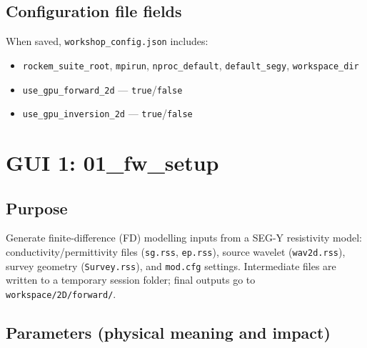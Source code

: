 \documentclass[11pt,a4paper]{article}
\begin{document}
\subsection{Configuration file fields}

When saved, \texttt{workshop\_config.json} includes:
\begin{itemize}
  \item \texttt{rockem\_suite\_root}, \texttt{mpirun}, \texttt{nproc\_default}, \texttt{default\_segy}, \texttt{workspace\_dir}
  \item \texttt{use\_gpu\_forward\_2d} — \texttt{true}/\texttt{false}
  \item \texttt{use\_gpu\_inversion\_2d} — \texttt{true}/\texttt{false}
\end{itemize}

\section{GUI 1: 01\_fw\_setup}

\subsection{Purpose}

Generate finite-difference (FD) modelling inputs from a SEG-Y resistivity model: conductivity/permittivity files (\texttt{sg.rss}, \texttt{ep.rss}), source wavelet (\texttt{wav2d.rss}), survey geometry (\texttt{Survey.rss}), and \texttt{mod.cfg} settings. Intermediate files are written to a temporary session folder; final outputs go to \texttt{workspace/2D/forward/}.

\subsection{Parameters (physical meaning and impact)}
\end{document}
